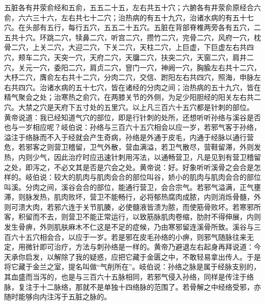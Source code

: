 \documentclass[a4paper,12pt,UTF8,twoside]{ctexbook}
\begin{document}
五脏各有井荥俞经和五俞，五五二十五，左右共五十穴；六腑各有井荥俞原经合六俞，六六三十六，左右共七十二穴；治热病的有五十九穴，治诸水病的有五十七穴。在头部有五行，每行五穴，五五二十五穴。五脏在背部脊椎两旁各有五穴，二五共十穴。环跳二穴，犊鼻二穴，听宫二穴，攒竹二穴，完骨二穴，风府一穴，枕骨二穴，上关二穴，大迎二穴，下关二穴，天柱二穴，上巨虚，下巨虚左右共四穴，颊车二穴，天突一穴，天府二穴，天牖二穴，扶突二穴，天窗二穴，肩井二穴，关元一穴，委阳二穴，肩贞二穴，窨门一穴，神阙一穴，胸腧左右共十二穴，大杼二穴，膺俞左右共十二穴，分肉二穴，交信、跗阳左右共四穴，照海，申脉左右共四穴。治诸水病的五十七穴，皆在诸经的分肉之间；治热病的五十九穴，皆在精气聚会之处；治寒热之俞穴，在两膝关节的外侧，为足少阳胆经的阳关左右共二穴。大禁之穴是天府下五寸处的五里穴。以上凡三百六十五穴都是针刺的部位。
黄帝说道：我已经知道气穴的部位，即是行针刺的处所，还想听听孙络与溪谷是否也与一岁相应呢？岐伯说：孙络与三百六十五穴相会以应一岁，若邪气客于孙络，溢注于络脉而不入于经就会产生奇病，孙络是外通于皮毛，内通于经脉以通行营危，若邪客之则营卫稽留，卫气外散，营血满溢，若卫气散尽，营鞋留滞，外则发热，内则少气，因此治疗时应迅速针刺用泻法，以通畅营卫，凡是见到有营卫稽留之处，即泻之，不必文其是否是穴会之处。黄帝说：好。好象听听溪骨之会合是怎样的。岐伯说：较大的肌肉与肌肉会合的部位叫谷，娇小的肌肉与肌肉会合的部位叫溪。分肉之间，溪谷会合的部位，能通行营卫，会合宗气。若邪气溢满，正气壅滞，则脉发热，肌肉败坏，营卫不能畅行，必将郁热腐肉成脓，内则消烁骨髓，外则可溃大肉，若邪六连于关节肌腠，必使髓液皆溃为脓，而使筋骨败坏。若寒邪所客，积留而不去，则营卫不能正常运行，以致筋脉肌肉卷缩，肋肘不得伸展，内则发生骨痹，外则肌肤麻木不仁这是不足的症候，乃由寒邪留连溪骨所致。溪谷与三百六十五穴相会合，以应于一岁。若是邪在皮毛孙络的小痹，则邪气随脉往来无定，用微针即可治疗，方法与刺孙络是一样的。黄帝乃避退左右起身再拜说道：今天承你启发，以解除了我的疑惑，应把它藏于金匮之中，不敢轻易拿出传人。于是将它藏于金兰之室，提名叫做“气削所在”。岐伯说：孙络之脉是属于经脉支别的，其血盛而当泻的，也是与三百六十五脉相同，若邪气侵入孙络，同样是传注于络脉，复注于十二脉络，那就不是单独十四络脉的范围了。若骨解之中经络受邪，亦随时能够向内注泻于五脏之脉的。
\end{document}

